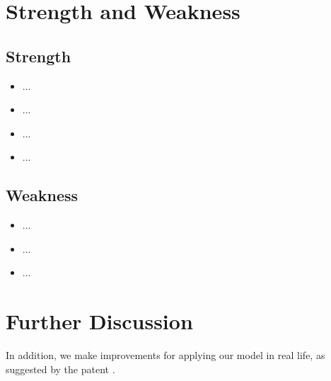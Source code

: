 \documentclass{mcmthesis}
\begin{document}
\section{Strength and Weakness}

\subsection{Strength}
    
\begin{itemize}
\item ...
    
\item ...
    
\item ...
    
\item ...
    
\end{itemize}
    
\subsection{Weakness}
    
\begin{itemize}
\item ...

\item ...
   
\item ...

\end{itemize}
    
\section{Further Discussion}
    
In addition, we make improvements for applying our model in real life, as suggested by the patent \textcite{patent2023}.
    
\end{document}
